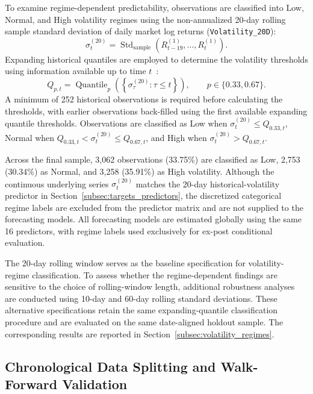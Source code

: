 \documentclass[12pt,twoside]{ord}
\begin{document}
To examine regime-dependent predictability, observations are classified into Low, Normal, and High volatility regimes using the non-annualized 20-day rolling sample standard deviation of daily market log returns (\texttt{Volatility\_20D}):
\begin{equation}\label{eq:volatility}
\sigma_t^{(20)} = \operatorname{Std}_{\mathrm{sample}}\left(R_{t-19}^{(1)}, \dots, R_t^{(1)}\right).
\end{equation}
Expanding historical quantiles are employed to determine the volatility thresholds using information available up to time $t$~\cite{feng2024}:
\begin{equation}\label{eq:quantiles}
Q_{p,t} = \operatorname{Quantile}_p\left(\left\{\sigma_\tau^{(20)} : \tau \le t\right\}\right), \qquad p \in \{0.33, 0.67\}.
\end{equation}
A minimum of 252 historical observations is required before calculating the thresholds, with earlier observations back-filled using the first available expanding quantile thresholds. Observations are classified as Low when $\sigma_t^{(20)} \le Q_{0.33,t}$, Normal when $Q_{0.33,t} < \sigma_t^{(20)} \le Q_{0.67,t}$, and High when $\sigma_t^{(20)} > Q_{0.67,t}$.

Across the final sample, 3,062 observations (33.75\%) are classified as Low, 2,753 (30.34\%) as Normal, and 3,258 (35.91\%) as High volatility. Although the continuous underlying series $\sigma_t^{(20)}$ matches the 20-day historical-volatility predictor in Section~\ref{subsec:targets_predictors}, the discretized categorical regime labels are excluded from the predictor matrix and are not supplied to the forecasting models. All forecasting models are estimated globally using the same 16 predictors, with regime labels used exclusively for ex-post conditional evaluation.

The 20-day rolling window serves as the baseline specification for volatility-regime classification. To assess whether the regime-dependent findings are sensitive to the choice of rolling-window length, additional robustness analyses are conducted using 10-day and 60-day rolling standard deviations. These alternative specifications retain the same expanding-quantile classification procedure and are evaluated on the same date-aligned holdout sample. The corresponding results are reported in Section~\ref{subsec:volatility_regimes}.

\subsection{Chronological Data Splitting and Walk-Forward Validation}\label{subsec:data_splitting}
\end{document}
